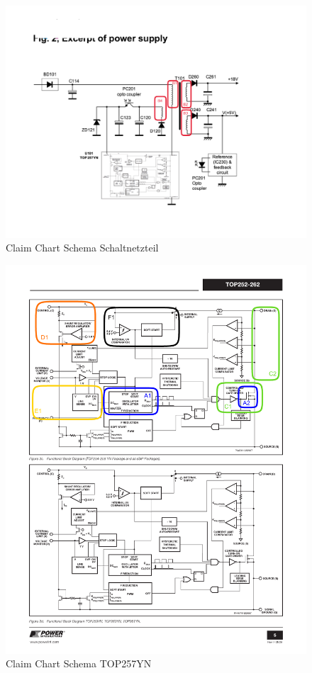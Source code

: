 \begin{figure}[h!]
	\centering
	\includegraphics[trim = 20mm 20mm 50mm 50mm, clip, width=1\textwidth]{graphics/SchemaClaim}
	\caption{Claim Chart Schema Schaltnetzteil}
	\label{fig:CCHSchema}
\end{figure} 
\newpage

\begin{figure}[h!]
	\centering
	\includegraphics[trim = 1mm 142mm 1mm 20mm, clip, width=1\textwidth]{graphics/SchemaClaim2}
	\caption{Claim Chart Schema TOP257YN}
	\label{fig:CCHSchema2}
\end{figure} 

